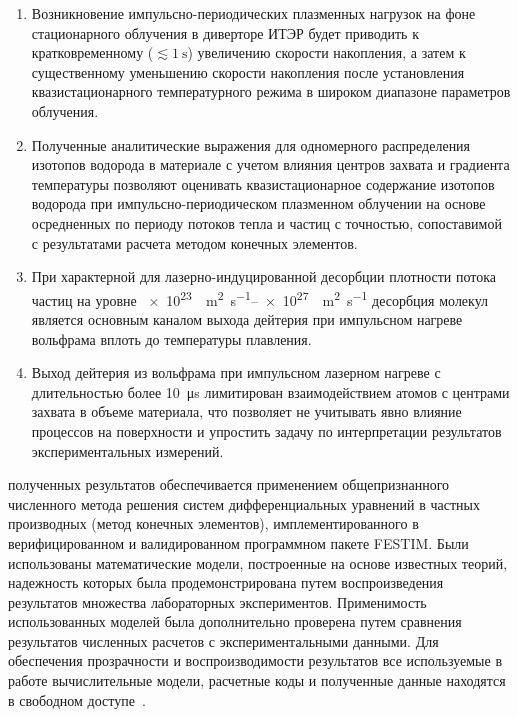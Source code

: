 {}
\begin{enumerate}[beginpenalty=10000] %
    \item Возникновение импульсно-периодических плазменных нагрузок на фоне стационарного облучения в диверторе ИТЭР будет приводить к кратковременному (\( \lesssim \SI{1}{\second} \)) увеличению скорости накопления, а затем к существенному уменьшению скорости накопления после установления квазистационарного температурного режима в широком диапазоне параметров облучения.
    \item Полученные аналитические выражения для одномерного распределения изотопов водорода в материале с учетом влияния центров захвата и градиента температуры позволяют оценивать квазистационарное содержание изотопов водорода при импульсно-периодическом плазменном облучении на основе осредненных по периоду потоков тепла и частиц с точностью, сопоставимой с результатами расчета методом конечных элементов.
    \item При характерной для лазерно-индуцированной десорбции плотности потока частиц на уровне \SIrange{e23}{e27}{\per\meter\squared\per\second} десорбция молекул является основным каналом выхода дейтерия при импульсном нагреве вольфрама вплоть до температуры плавления.
    \item Выход дейтерия из вольфрама при импульсном лазерном нагреве с длительностью более \SI{10}{\micro\second} лимитирован взаимодействием атомов с центрами захвата в объеме материала, что позволяет не учитывать явно влияние процессов на поверхности и упростить задачу по интерпретации результатов экспериментальных измерений.
\end{enumerate}

{\reliability} полученных результатов обеспечивается применением общепризнанного численного метода решения систем дифференциальных уравнений в частных производных (метод конечных элементов), имплементированного в верифицированном и валидированном программном пакете FESTIM. Были использованы математические модели, построенные на основе известных теорий, надежность которых была продемонстрирована путем воспроизведения результатов множества лабораторных экспериментов. Применимость использованных моделей была дополнительно проверена путем сравнения результатов численных расчетов с экспериментальными данными. Для обеспечения прозрачности и воспроизводимости результатов все используемые в работе вычислительные модели, расчетные коды и полученные данные находятся в свободном доступе~\cite{Kulagin_PhD_2025}.

